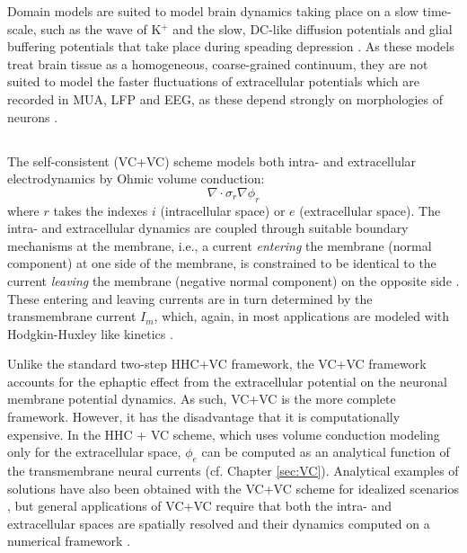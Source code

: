Domain models are suited to model brain dynamics taking place on a slow time-scale, such as the wave of K$^+$ and the slow, DC-like diffusion potentials and glial buffering potentials that take place during speading depression \citep{Mori2015, OConnell2016, tuttle2019}. As these models treat brain tissue as a homogeneous, coarse-grained continuum, they are not suited to model the faster fluctuations of extracellular potentials which are recorded in MUA, LFP and EEG, as these depend strongly on morphologies of neurons \citep{Einevoll2013}. 




\subsection{}
The self-consistent (VC+VC) scheme models both intra- and extracellular electrodynamics by Ohmic volume conduction:
\begin{equation}
\nabla \cdot \sigma_r \nabla \phi_r
\end{equation}
where $r$ takes the indexes $i$ (intracellular space) or $e$ (extracellular space). The intra- and extracellular dynamics are coupled through suitable boundary mechanisms at the membrane, i.e., a current \textit{entering} the membrane (normal component) at one side of the membrane, is constrained to be identical to the current \textit{leaving} the membrane (negative normal component) on the opposite side  \citep{Krassowska1994}. These entering and leaving currents are in turn determined by the transmembrane current $I_m$, which, again, in most applications are modeled with Hodgkin-Huxley like kinetics \citep{Agudelo-Toro2013, Tveito2017}. 

Unlike the standard two-step HHC+VC framework, the VC+VC framework accounts for the ephaptic 
effect from the extracellular potential on the neuronal membrane potential dynamics. As such, VC+VC is the more complete framework. However, it has the disadvantage that it is computationally expensive. In the HHC + VC scheme, which uses volume conduction modeling only for the extracellular space, $\phi_e$ can be computed as an analytical function of the transmembrane neural currents (cf. Chapter \ref{sec:VC}). Analytical examples of solutions have also been obtained with the VC+VC scheme for idealized scenarios 
 \citep{Krassowska1994}, but general applications of VC+VC require that both the intra- and extracellular spaces are spatially resolved and their dynamics computed on a numerical framework \citep{Agudelo-Toro2013, Tveito2017}. 


